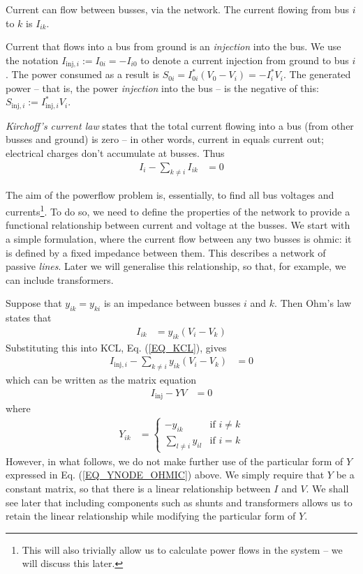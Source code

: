 \documentclass[11pt]{article}
\begin{document}
Current can flow between busses, via the network. The current flowing from bus $i$ to $k$ is $I_{ik}$. 

Current that flows into a bus from ground is an \emph{injection} into the bus. We use the notation $I_{\text{inj},i} := I_{0i} = -I_{i0}$ to denote a current injection from ground to bus $i$. The power consumed as a result is $S_{0i} = I_{0i}^*(V_0 - V_i) = -I_{i}^*V_i$. The generated power -- that is, the power \emph{injection} into the bus -- is the negative of this: $S_{\text{inj},i} := I_{\text{inj},i}^*V_i$.

\emph{Kirchoff's current law} states that the total current flowing into a bus (from other busses and ground) is zero -- in other words, current in equals current out; electrical charges don't accumulate at busses. Thus
\begin{align}
	I_{i} - \sum_{k \ne i}{I_{ik}} &= 0
	\label{EQ_KCL}
\end{align}

The aim of the powerflow problem is, essentially, to find all bus voltages and currents\footnote{This will also trivially allow us to calculate power flows in the system -- we will discuss this later.}. To do so, we need to define the properties of the network to provide a functional relationship between current and voltage at the busses. We start with a simple formulation, where the current flow between any two busses is ohmic: it is defined by a fixed impedance between them. This describes a network of passive \emph{lines}. Later we will generalise this relationship, so that, for example, we can include transformers.

Suppose that $y_{ik} = y_{ki}$ is an impedance between busses $i$ and $k$. Then Ohm's law states that
\begin{align}
	I_{ik} &= y_{ik}(V_i - V_k)
\end{align}
Substituting this into KCL, Eq. (\ref{EQ_KCL}), gives
\begin{align}
	I_{\text{inj},i} - \sum_{k \ne i}{y_{ik}(V_i - V_k)} &= 0
	\label{EQ_PF_1}
\end{align}
which can be written as the matrix equation
\begin{align}
	I_\text{inj} - YV &= 0
\end{align}
where
\begin{align}
	Y_{ik} &=
		\begin{cases}
			-y_{ik}&\text{if $i \ne k$} \\
			\sum_{l \ne i} y_{il}& \text{if $i = k$}
		\end{cases}
	\label{EQ_YNODE_OHMIC}
\end{align}
However, in what follows, we do not make further use of the particular form of $Y$ expressed in Eq. (\ref{EQ_YNODE_OHMIC}) above. We simply require that $Y$ be a constant matrix, so that there is a linear relationship between $I$ and $V$. We shall see later that including components such as shunts and transformers allows us to retain the linear relationship while modifying the particular form of $Y$.
\end{document}
